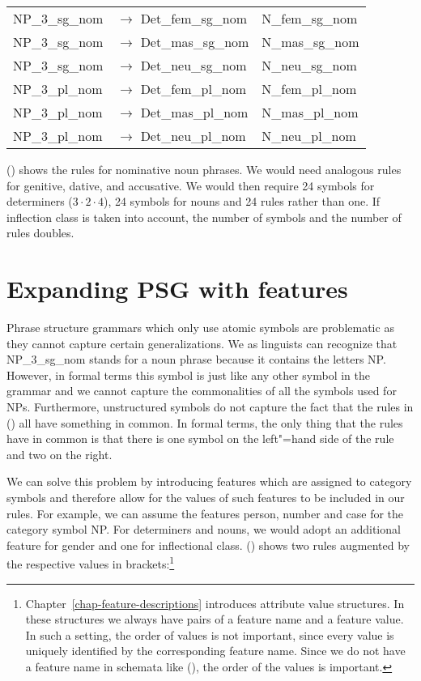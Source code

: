 \begin{tabular}[t]{@{}l@{ }l@{~~}l}
NP\_3\_sg\_nom  & $\to$ Det\_fem\_sg\_nom & N\_fem\_sg\_nom \\
NP\_3\_sg\_nom  & $\to$ Det\_mas\_sg\_nom & N\_mas\_sg\_nom \\
NP\_3\_sg\_nom  & $\to$ Det\_neu\_sg\_nom & N\_neu\_sg\_nom \\
NP\_3\_pl\_nom  & $\to$ Det\_fem\_pl\_nom & N\_fem\_pl\_nom \\
NP\_3\_pl\_nom  & $\to$ Det\_mas\_pl\_nom & N\_mas\_pl\_nom \\
NP\_3\_pl\_nom  & $\to$ Det\_neu\_pl\_nom & N\_neu\_pl\_nom \\[2mm]
\end{tabular}
\z
() shows the rules for nominative noun phrases. We would need analogous rules for genitive,
dative, and accusative. We would then require 24 symbols for determiners ($3 \cdot 2 \cdot 4$), 24 symbols for nouns and
24 rules rather than one. If inflection class is taken into account, the number of symbols and the
number of rules doubles. 

\section{Expanding PSG with features}
\label{sec-PSG-Merkmale}

Phrase structure grammars which only use atomic symbols are problematic as they cannot capture certain generalizations.
We as linguists can recognize that NP\_3\_sg\_nom stands for a noun phrase because it contains the letters NP. 
However, in formal terms this symbol is just like any other symbol in the grammar and we cannot capture the commonalities
of all the symbols used for NPs. Furthermore, unstructured symbols do not capture the fact that the rules in () 
all have something in common. In formal terms, the only thing that the rules have in common is that there is one symbol on the
left"=hand side of the rule and two on the right.

We can solve this problem by introducing features which are assigned to category symbols and therefore allow for the values of
such features to be included in our rules. For example, we can assume the features person, number and case for the category
symbol NP. For determiners and nouns, we would adopt an additional feature for gender and one for
inflectional class. () shows two rules augmented by the respective values in brackets:\footnote{%
  Chapter~\ref{chap-feature-descriptions} introduces attribute value structures. In these structures we always
have pairs of a feature name and a feature value. In such a setting, the order of values is not
important, since every value is uniquely identified by the corresponding feature name. Since we do not have a feature name
in schemata like (), the order of the values is important.
}

